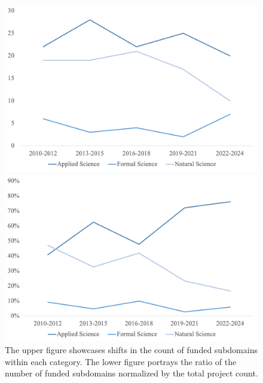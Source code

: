 \begin{figure}[H]
    \centering
    \begin{minipage}{0.7\textwidth}
        \centering
        \includegraphics[width=\textwidth]{Figures/The number of subdomains within each category.png}
      
    \end{minipage}

    \begin{minipage}{0.7\textwidth}
        \centering
        \includegraphics[width=\textwidth]{Figures/Evolution of Funding Distribution Across Categories.png}
       
    \end{minipage}
 
    \caption[Changing Subdomain Counts Across Categories Over Time]{
The upper figure showcases shifts in the count of funded subdomains within each category. The lower figure portrays the ratio of the number of funded subdomains normalized by the total project count.}
    \label{fig:combined}
\end{figure}
